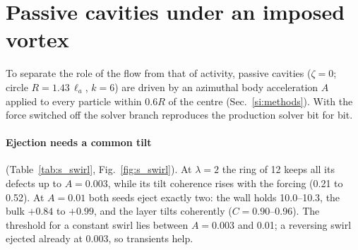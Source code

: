 \documentclass[aps,prl,onecolumn,superscriptaddress,amsmath,amssymb,nofootinbib]{revtex4-2}
\newcommand{\la}{\ell_a}
\begin{document}
\section{Passive cavities under an imposed vortex}\label{si:swirl}
To separate the role of the flow from that of activity, passive cavities ($\zeta=0$; circle $R=1.43\,\la$, $k=6$) are driven by an azimuthal body acceleration $A$
applied to every particle within $0.6R$ of the centre (Sec.~\ref{si:methods}). With the force switched off the solver branch reproduces the production solver bit for bit.

\paragraph{Ejection needs a common tilt} (Table~\ref{tab:s_swirl}, Fig.~\ref{fig:s_swirl}). At $\lambda=2$ the ring of 12 keeps all its defects up to $A=0.003$, while its
tilt coherence rises with the forcing (0.21 to 0.52). At $A=0.01$ both seeds eject exactly two: the wall holds 10.0--10.3, the bulk $+0.84$ to $+0.99$, and the layer tilts
coherently ($C=0.90$--0.96). The threshold for a constant swirl lies between $A=0.003$ and 0.01; a reversing swirl ejected already at 0.003, so transients help.
\end{document}
